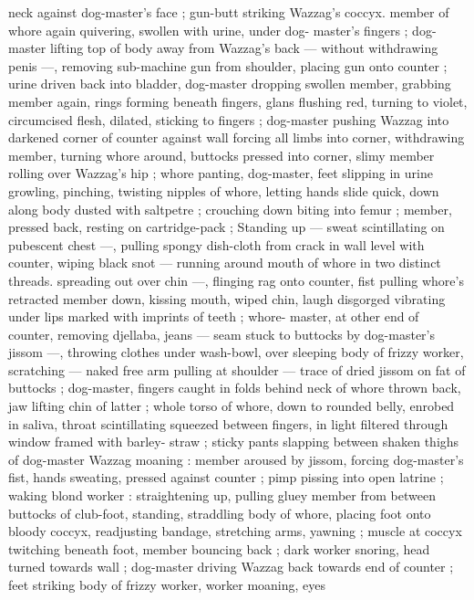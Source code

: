 neck against dog-master's face ; gun-butt striking Wazzag's coccyx. 
member of whore again quivering, swollen with urine, under dog- 
master's fingers ; dog-master lifting top of body away from Wazzag's 
back --- without withdrawing penis ---, removing sub-machine gun 
from shoulder, placing gun onto counter ; urine driven back into 
bladder, dog-master dropping swollen member, grabbing member 
again, rings forming beneath fingers, glans flushing red, turning to 
violet, circumcised flesh, dilated, sticking to fingers ; dog-master 
pushing Wazzag into darkened corner of counter against wall 
forcing all limbs into corner, withdrawing member, turning whore 
around, buttocks pressed into corner, slimy member rolling over 
Wazzag's hip ; whore panting, dog-master, feet slipping in urine 
growling, pinching, twisting nipples of whore, letting hands slide 
quick, down along body dusted with saltpetre ; crouching down 
biting into femur ; member, pressed back, resting on cartridge-pack 
; Standing up --- sweat scintillating on pubescent chest ---, pulling 
spongy dish-cloth from crack in wall level with counter, wiping black 
snot --- running around mouth of whore in two distinct threads. 
spreading out over chin ---, flinging rag onto counter, fist pulling 
whore's retracted member down, kissing mouth, wiped chin, laugh 
disgorged vibrating under lips marked with imprints of teeth ; whore- 
master, at other end of counter, removing djellaba, jeans --- seam 
stuck to buttocks by dog-master's jissom ---, throwing clothes under 
wash-bowl, over sleeping body of frizzy worker, scratching --- naked 
free arm pulling at shoulder --- trace of dried jissom on fat of 
buttocks ; dog-master, fingers caught in folds behind neck of whore 
thrown back, jaw lifting chin of latter ; whole torso of whore, down to 
rounded belly, enrobed in saliva, throat scintillating squeezed 
between fingers, in light filtered through window framed with barley- 
straw ; sticky pants slapping between shaken thighs of dog-master 
Wazzag moaning : member aroused by jissom, forcing dog-master's 
fist, hands sweating, pressed against counter ; pimp pissing into 
open latrine ; waking blond worker : straightening up, pulling gluey 
member from between buttocks of club-foot, standing, straddling 
body of whore, placing foot onto bloody coccyx, readjusting 
bandage, stretching arms, yawning ; muscle at coccyx twitching 
beneath foot, member bouncing back ; dark worker snoring, head 
turned towards wall ; dog-master driving Wazzag back towards end 
of counter ; feet striking body of frizzy worker, worker moaning, eyes 
